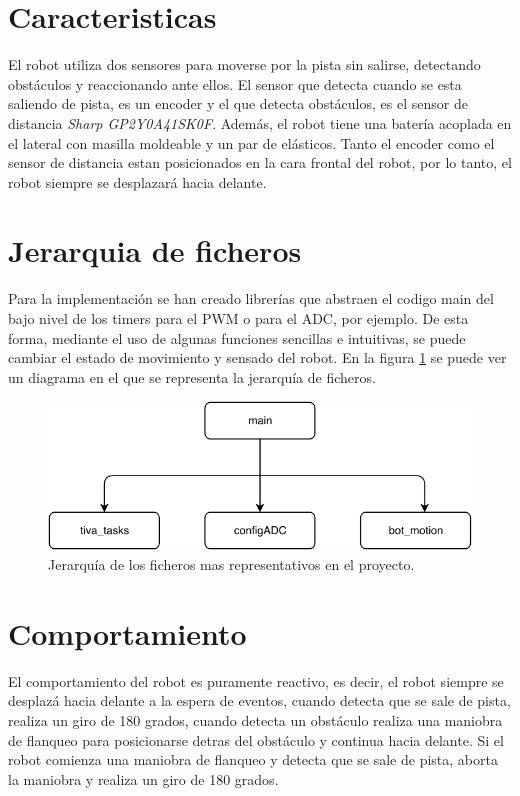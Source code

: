 \documentclass[conference]{IEEEtran}
\begin{document}
\section{\large{Caracteristicas}}
\large{El robot utiliza dos sensores para moverse por la pista sin salirse, detectando obstáculos y reaccionando ante ellos. El sensor que detecta cuando se esta saliendo de pista, es un encoder y el que detecta obstáculos, es el sensor de distancia \textit{Sharp GP2Y0A41SK0F}. Además, el robot tiene una batería acoplada en el lateral con masilla moldeable y un par de elásticos. Tanto el encoder como el sensor de distancia estan posicionados en la cara frontal del robot, por lo tanto, el robot siempre se desplazará hacia delante.}\\

\section{\large{Jerarquia de ficheros}}
Para la implementación se han creado librerías que abstraen el codigo main del bajo nivel de los timers para el PWM o para el ADC, por ejemplo. De esta forma, mediante el uso de algunas funciones sencillas e intuitivas, se puede cambiar el estado de movimiento y sensado del robot. En la figura \ref{fig:jerarquia} se puede ver un diagrama en el que se representa la jerarquía de ficheros.

\begin{figure}[h]
    \centering
    \includegraphics[width=\linewidth]{photos/jerarquia.pdf}
    \caption{\large{Jerarquía de los ficheros mas representativos en el proyecto.}}
    \label{fig:jerarquia}
\end{figure}

\section{\large{Comportamiento}}
El comportamiento del robot es puramente reactivo, es decir, el robot siempre se desplazá hacia delante a la espera de eventos, cuando detecta que se sale de pista, realiza un giro de 180 grados, cuando detecta un obstáculo realiza una maniobra de flanqueo para posicionarse detras del obstáculo y continua hacia delante. Si el robot comienza una maniobra de flanqueo y detecta que se sale de pista, aborta la maniobra y realiza un giro de 180 grados.\\
\end{document}
